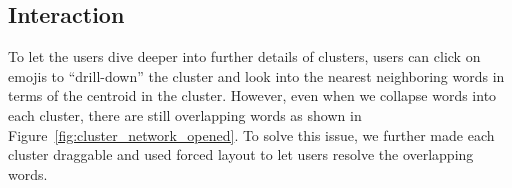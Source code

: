 \subsection{Interaction}
To let the users dive deeper into further details of clusters, users can click on emojis to ``drill-down'' \cite{Elmqvist:2010:HAI:1749404.1749525} the cluster and look into the nearest neighboring words in terms of the centroid in the cluster.
However, even when we collapse words into each cluster, there are still overlapping words as shown in Figure~\ref{fig:cluster_network_opened}. 
To solve this issue, we further made each cluster draggable and used forced layout to let users resolve the overlapping words. 

